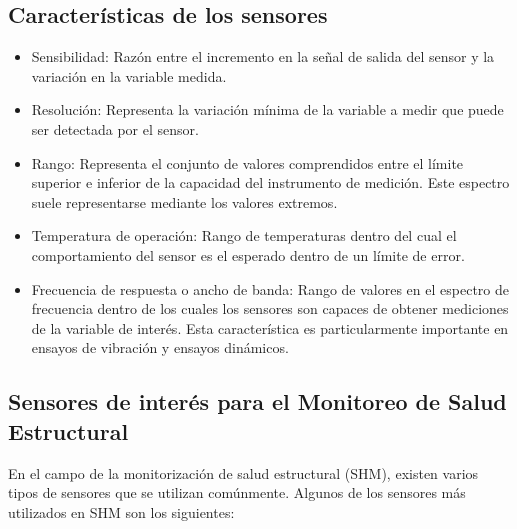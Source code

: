 \subsection{Características de los sensores}

\begin{itemize}
    \item Sensibilidad: Razón entre el incremento en la señal de salida del sensor y la variación en la variable medida.
    \item Resolución: Representa la variación mínima de la variable a medir que puede ser detectada por el sensor.
    \item Rango: Representa el conjunto de valores comprendidos entre el límite superior e inferior de la capacidad del instrumento de medición. Este espectro suele representarse mediante los valores extremos.
    \item Temperatura de operación: Rango de temperaturas dentro del cual el comportamiento del sensor es el esperado dentro de un límite de error.
    \item Frecuencia de respuesta o ancho de banda: Rango de valores en el espectro de frecuencia dentro de los cuales los sensores son capaces de obtener mediciones de la variable de interés. Esta característica es particularmente importante en ensayos de vibración y ensayos dinámicos.
\end{itemize}

\subsection{Sensores de interés para el Monitoreo de Salud Estructural}
\label{subsec:sensmonitoreo}

En el campo de la monitorización de salud estructural (SHM), existen varios tipos de sensores que se utilizan comúnmente. Algunos de los sensores más utilizados en SHM son los siguientes:

